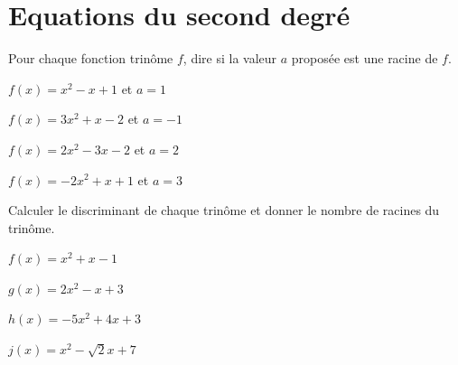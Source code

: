 \documentclass[11pt,a4paper]{article}  %
\begin{document}
	\graphicspath{{./images/}}
	
	\begin{center}
		
		
	\end{center}

\section*{Equations du second degré}

\exercice{}

Pour chaque fonction trinôme $f$, dire si la valeur $a$ proposée est une racine de $f$.
\begin{enumMet}
	\item $f(x)=x^2-x+1$ et $a=1$
	\item $f(x)=3 x^2+x-2$ et $a=-1$
	\item $f(x)=2 x^2-3 x-2$ et $a=2$
	\item $f(x)=-2 x^2+x+1$ et $a=3$
\end{enumMet}

\exercice{}

Calculer le discriminant de chaque trinôme et donner le nombre de racines du trinôme.
\begin{enumMet}
	\item $f(x)=x^2+x-1$
	\item $g(x)=2 x^2-x+3$
	\item $h(x)=-5 x^2+4 x+3$
	\item $j(x)=x^2-\sqrt{2} x+7$
\end{enumMet}
\end{document}
